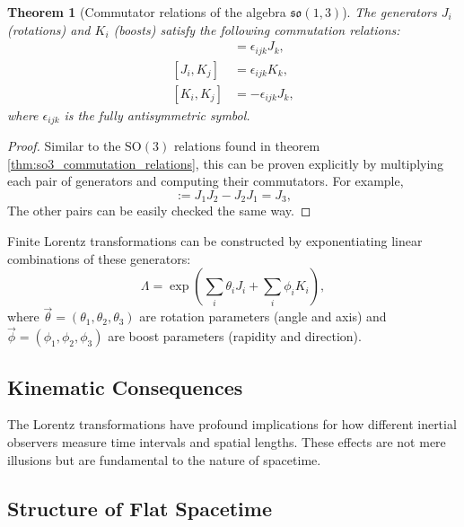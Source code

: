 \documentclass{amsart}
\newtheorem{theorem}{Theorem}[section]
\theoremstyle{definition}
\theoremstyle{remark}
\begin{document}
\begin{theorem}[Commutator relations of the algebra $\mathfrak{so}(1,3)$]\label{thm:so13_algebra_commutation_relations}
  The generators $J_i$ (rotations) and $K_i$ (boosts) satisfy the following commutation relations:
  \begin{align*}
    [J_i, J_j] &= \epsilon_{ijk} J_k, \\
    [J_i, K_j] &= \epsilon_{ijk} K_k, \\
    [K_i, K_j] &= -\epsilon_{ijk} J_k,
  \end{align*}
  where $\epsilon_{ijk}$ is the fully antisymmetric symbol.
\end{theorem}
\begin{proof}
    Similar to the $\mathrm{SO}(3)$ relations found in theorem \ref{thm:so3_commutation_relations}, this can be proven explicitly by multiplying each pair of generators and computing their commutators.
  For example,
  \begin{equation*}
    [J_1, J_2] := J_1 J_2 - J_2 J_1 = J_3,
  \end{equation*}
  The other pairs can be easily checked the same way.
\end{proof}

Finite Lorentz transformations can be constructed by exponentiating linear combinations of these generators:
\begin{equation*}
  \Lambda = \exp\left(\sum_i \theta_i J_i + \sum_i \phi_i K_i \right),
\end{equation*}
where $\vec{\theta} = (\theta_1, \theta_2, \theta_3)$ are rotation parameters (angle and axis) and $\vec{\phi} = (\phi_1, \phi_2, \phi_3)$ are boost parameters (rapidity and direction).

\subsection{Kinematic Consequences}
\label{subsec:sr_kinematics}
The Lorentz transformations have profound implications for how different inertial observers measure time intervals and spatial lengths.
These effects are not mere illusions but are fundamental to the nature of spacetime.

\subsection{Structure of Flat Spacetime}
\label{subsec:sr_structure}
\end{document}
